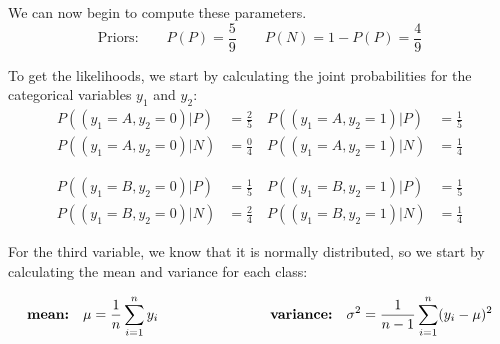 \documentclass[12pt]{article}
\begin{document}
\begin{enumerate}[leftmargin=\labelsep]
    \vspace{10pt}
    We can now begin to compute these parameters.
    \vspace{10pt}
    \begin{equation*}
        \text{Priors:} \qquad
        P(P) = \frac{5}{9} \quad \quad P(N) = 1- P(P) = \frac{4}{9} 
    \end{equation*}

    \vspace{10pt}
    To get the likelihoods, we start by calculating the joint probabilities for the categorical variables $y_1$ and $y_2$:
    \begin{equation*}
        \begin{aligned}
        P((y_1 = A, y_2 = 0)|P) &= \frac{2}{5} \quad  P((y_1= A, y_2 = 1)|P) &= \frac{1}{5} 
        \\
        P((y_1 = A, y_2 = 0)|N) &= \frac{0}{4} \quad  P((y_1 = A, y_2= 1)|N) &= \frac{1}{4} 
        \end{aligned}
    \end{equation*}

    \begin{equation*}
        \begin{aligned}
        P((y_1 = B, y_2 = 0)|P) &= \frac{1}{5} \quad  P((y_1 = B, y_2 = 1)|P) &= \frac{1}{5} 
        \\
        P((y_1 = B, y_2 = 0)|N) &= \frac{2}{4} \quad  P((y_1 = B, y_2 = 1)|N) &= \frac{1}{4} 
        \end{aligned}
    \end{equation*}

    \vspace{10pt}
    For the third variable, we know that it is normally distributed, so we start by calculating the mean and variance for each class:

    \begin{equation*}
            \textbf{\text{mean:}} \quad \mu = \frac{1}{n} \sum_{i=1}^{n} y_i \qquad\qquad\qquad\qquad \textbf{\text{variance:}} \quad \sigma^2 = \frac{1}{n-1} \sum_{i=1}^{n} (y_i - \mu)^2
    \end{equation*}


\end{enumerate}
\end{document}
